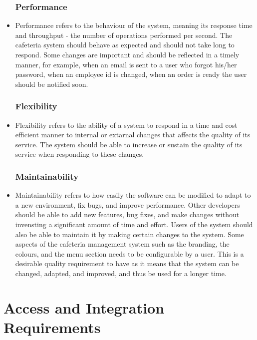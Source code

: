 \documentclass[a4paper,12pt]{article}
\begin{document}
\begin{itemize}
\subsubsection{Performance}
\item  Performance refers to the behaviour of the system, meaning its response time and throughput - the number of operations performed per second. The cafeteria system should behave as expected and should not take long to respond. Some changes are important and should be reflected in a timely manner, for example, when an email is sent to a user who forgot his/her password, when an employee id is changed, when an order is ready the user should be notified soon.

\subsubsection{Flexibility}
\item  Flexibility refers to the ability of a system to respond in a time and cost efficient manner to internal or extarnal changes that affects the quality of its service. The system should be able to increase or sustain the quality of its service when responding to these changes.

\subsubsection{Maintainability}
\item  Maintainability refers to how easily the software can be modified to adapt to a new environment, fix bugs, and improve performance. Other developers should be able to add new features, bug fixes, and make changes without invensting a significant amount of time and effort. Users of the system should also be able to maintain it by making certain changes to the system. Some aspects of the cafeteria management system such as the branding, the colours, and the menu section needs to be configurable by a user. This is a desirable quality requirement to have as it means that the system can be changed, adapted, and improved, and thus be used for a longer time.
\end{itemize}


\section{Access and Integration Requirements}\
\end{document}
